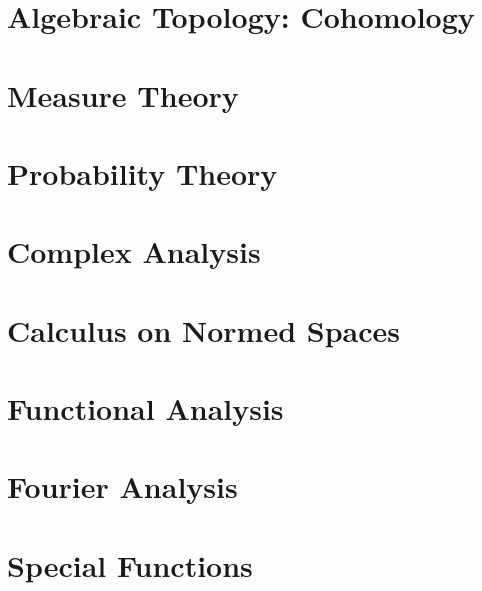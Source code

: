 \documentclass[oneside]{book}                                                  %
\newcommand*{\TOPPATH}{books}
\newcommand*{\PATH}{\TOPPATH/}
\newcounter{endpage}
\begin{document}
        \part{Algebraic Topology: Cohomology}
    \clearpage

    \setcounter{endpage}{\thepage}
        \label{book:Analysis}
        \renewcommand{\PATH}{\TOPPATH/Analysis}
        \setcounter{page}{\value{endpage}}
        \part{Measure Theory}
            
        \part{Probability Theory}
            
        \part{Complex Analysis}
            
        \part{Calculus on Normed Spaces}
            
        \part{Functional Analysis}
            
        \part{Fourier Analysis}
            
            
        \part{Special Functions}
            
            
    \clearpage

    \setcounter{endpage}{\thepage}
        \label{book:Geometry}
        \renewcommand{\PATH}{\TOPPATH/Geometry}
        \setcounter{page}{\value{endpage}}
\end{document}
